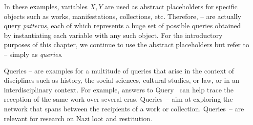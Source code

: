 %
In these examples, variables $X,Y$ are used as abstract placeholders for specific objects
such as works, manifestations, collections, etc. Therefore, -- are actually
query \emph{patterns}, each of which represents a huge set of possible queries
obtained by instantiating each variable with any such object.
For the introductory purposes of this chapter,
we continue to use the abstract placeholders but refer to --
simply as \emph{queries}. %

%
Queries -- are examples for a multitude of queries that arise
in the context of disciplines such as history, the social sciences, cultural studies, or law,
or in an interdisciplinary context.
For example, answers to
Query~ can help trace the reception
of the same work over several eras.
Queries~--
aim at exploring the network
that spans between the recipients of a work or collection.
Queries~-- are relevant for research on Nazi loot and restitution.

%
%

